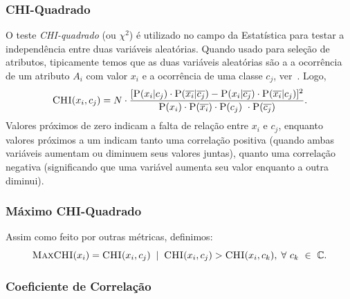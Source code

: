 \subsubsection{CHI-Quadrado}
\label{subsubsection::chi}

O teste \textit{CHI-quadrado} (ou $\chi^2$) é utilizado no campo da Estatística para testar a independência entre duas variáveis aleatórias. Quando usado para seleção de atributos, tipicamente temos que as duas variáveis aleatórias são a a ocorrência de um atributo $A_i$ com valor $x_i$ e a ocorrência de uma classe $c_j$, ver~\cite{Zheng03}. Logo,
\begin{equation}\label{eqn::chi}
  \textsc{CHI}(x_i, c_j) = N \cdot \frac{ [ \textsc{P}(x_i|c_j) \cdot \textsc{P}(\overline{x_i}|\overline{c_j}) - \textsc{P}(x_i|\overline{c_j}) \cdot \textsc{P}(\overline{x_i}|c_j) ]^2 } {\textsc{P}(x_i) \cdot \textsc{P}(\overline{x_i}) \cdot \textsc{P}(c_j) \ \cdot \textsc{P}(\overline{c_j}) }.
\end{equation}
Valores próximos de zero indicam a falta de relação entre $x_i$ e $c_j$, enquanto valores próximos a um indicam tanto uma correlação positiva (quando ambas variáveis aumentam ou diminuem seus valores juntas), quanto uma correlação negativa (significando que uma variável aumenta seu valor enquanto a outra diminui).

\subsubsection{Máximo CHI-Quadrado}
\label{subsubsection::maxchi}

Assim como feito por outras métricas, definimos:
\begin{equation}\label{eqn::maxchi}
\textsc{MaxCHI}(x_i) = \textsc{CHI}(x_i,c_j) \; \; | \;\; \textsc{CHI}(x_i, c_j) > \textsc{CHI}(x_i, c_k), \; \forall\ c_k\ \in\ \mathbb{C}.
\end{equation}


\subsubsection{Coeficiente de Correlação}
\label{subsubsection::cc}

